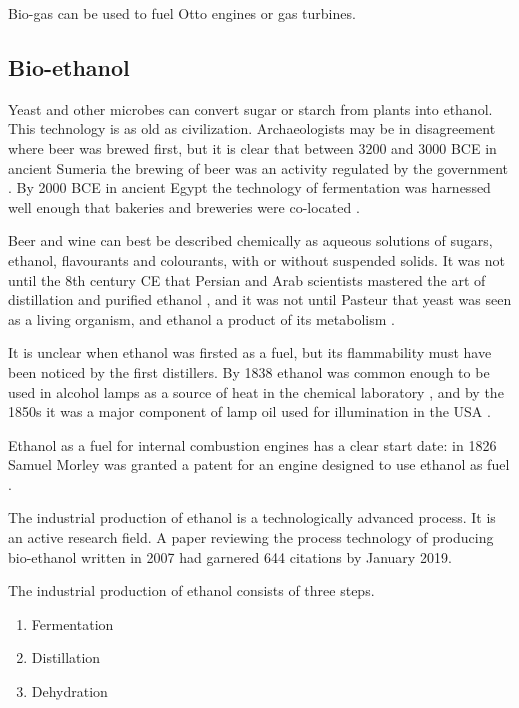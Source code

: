 Bio-gas can be used to fuel Otto engines or gas turbines. 

\subsection{Bio-ethanol}

Yeast and other microbes can convert sugar or starch from plants into ethanol.
This technology is as old as civilization. Archaeologists may be in disagreement
where beer was brewed first, but it is clear that between 3200 and 3000 BCE in
ancient Sumeria the brewing of beer was an activity regulated by the government
\autocite{Damerow2012}. By 2000 BCE in ancient Egypt the technology of
fermentation was harnessed well enough that bakeries and breweries were
co-located \autocite{1920}.

Beer and wine can best be described chemically as aqueous solutions of sugars,
ethanol, flavourants and colourants, with or without suspended solids. It was
not until the 8th century CE that Persian and Arab scientists mastered the art
of distillation and purified ethanol \autocite{Modanlou2008}, and it was not
until Pasteur that yeast was seen as a living organism, and ethanol a product of
its metabolism \autocite{Barnett2000}.

It is unclear when ethanol was firsted as a fuel, but its flammability must have
been noticed by the first distillers. By 1838 ethanol was common enough to be
used in alcohol lamps as a source of heat in the chemical laboratory
\autocite{Griffin1838}, and by the 1850s it was a major component of lamp oil
used for illumination in the USA \autocite{Abebe2008}.

Ethanol as a fuel for internal combustion engines has a clear start date: in 1826
Samuel Morley was granted a patent for an engine designed to use ethanol as fuel
\autocite[p. 79]{Cummins1989}.

The industrial production of ethanol is a technologically advanced process. It
is an active research field. A paper \autocite{Cardona2007} reviewing the process
technology of producing bio-ethanol written in 2007 had garnered 644 citations
by January 2019.

The industrial production of ethanol consists of three steps. 

\begin{enumerate}
  \item Fermentation
  \item Distillation
  \item Dehydration
\end{enumerate} 

